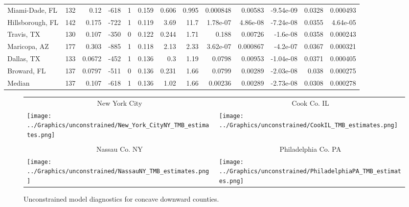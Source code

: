 \documentclass[12pt,letterpaper]{article}
\begin{document}
\begin{sidewaystable}
{\begin{tabular}{lrrrrrrrrrrrr}
 Miami-Dade, FL    &   132 &  0.12   &  -618 &     1 &           0.159 &            0.606 &          0.995 &     0.000848 &     0.00583  &        -9.54e-09 &           0.0328  &        0.000493 \\
 Hillsborough, FL  &   142 &  0.175  &  -722 &     1 &           0.119 &            3.69  &         11.7   &     1.78e-07 &     4.86e-08 &        -7.24e-08 &           0.0355  &        4.64e-05 \\
 Travis, TX        &   130 &  0.107  &  -350 &     0 &           0.122 &            0.244 &          1.71  &     0.188    &     0.00726  &        -1.6e-08  &           0.0358  &        0.000243 \\
 Maricopa, AZ      &   177 &  0.303  &  -885 &     1 &           0.118 &            2.13  &          2.33  &     3.62e-07 &     0.000867 &        -4.2e-07  &           0.0367  &        0.000321 \\
 Dallas, TX        &   133 &  0.0672 &  -452 &     1 &           0.136 &            0.3   &          1.19  &     0.0798   &     0.00953  &        -1.04e-08 &           0.0371  &        0.000405 \\
 Broward, FL       &   137 &  0.0797 &  -511 &     0 &           0.136 &            0.231 &          1.66  &     0.0799   &     0.00289  &        -2.03e-08 &           0.038   &        0.000275 \\
\hline
 Median            &   137 &  0.107  &  -618 &     1 &           0.136 &            1.02  &          1.66  &     0.00236  &     0.00289  &        -2.73e-08 &           0.0308  &        0.000278 \\
\hline
\end{tabular}


}\end{sidewaystable}


\begin{figure}
{\scriptsize
\begin{center}
\begin{tabular}{ll}
\multicolumn{1}{c}{New York City}&\multicolumn{1}{c}{Cook Co. IL}\\
\texttt{[image: ../Graphics/unconstrained/New\_York\_CityNY\_TMB\_estimates.png]}&
\texttt{[image: ../Graphics/unconstrained/CookIL\_TMB\_estimates.png]}\\
\\
\multicolumn{1}{c}{Nassau Co. NY}&\multicolumn{1}{c}{Philadelphia Co.  PA}\\
\texttt{[image: ../Graphics/unconstrained/NassauNY\_TMB\_estimates.png]}&
\texttt{[image: ../Graphics/unconstrained/PhiladelphiaPA\_TMB\_estimates.png]}\\
\end{tabular}
\end{center}
}
\caption{\label{fig:ests1U}
Unconstrained model diagnostics for concave downward counties.
}
\end{figure}
\end{document}
